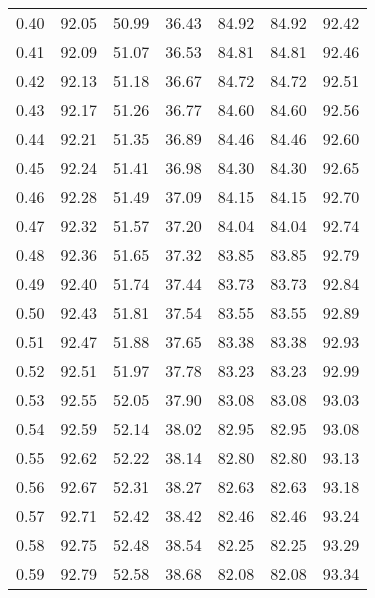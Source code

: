 \begin{tabular}{|c|c|c|c|c|c|c|}
      0.40 &     92.05 &     50.99 &      36.43 &   84.92 &      84.92 &         92.42 \\
      0.41 &     92.09 &     51.07 &      36.53 &   84.81 &      84.81 &         92.46 \\
      0.42 &     92.13 &     51.18 &      36.67 &   84.72 &      84.72 &         92.51 \\
      0.43 &     92.17 &     51.26 &      36.77 &   84.60 &      84.60 &         92.56 \\
      0.44 &     92.21 &     51.35 &      36.89 &   84.46 &      84.46 &         92.60 \\
      0.45 &     92.24 &     51.41 &      36.98 &   84.30 &      84.30 &         92.65 \\
      0.46 &     92.28 &     51.49 &      37.09 &   84.15 &      84.15 &         92.70 \\
      0.47 &     92.32 &     51.57 &      37.20 &   84.04 &      84.04 &         92.74 \\
      0.48 &     92.36 &     51.65 &      37.32 &   83.85 &      83.85 &         92.79 \\
      0.49 &     92.40 &     51.74 &      37.44 &   83.73 &      83.73 &         92.84 \\
      0.50 &     92.43 &     51.81 &      37.54 &   83.55 &      83.55 &         92.89 \\
      0.51 &     92.47 &     51.88 &      37.65 &   83.38 &      83.38 &         92.93 \\
      0.52 &     92.51 &     51.97 &      37.78 &   83.23 &      83.23 &         92.99 \\
      0.53 &     92.55 &     52.05 &      37.90 &   83.08 &      83.08 &         93.03 \\
      0.54 &     92.59 &     52.14 &      38.02 &   82.95 &      82.95 &         93.08 \\
      0.55 &     92.62 &     52.22 &      38.14 &   82.80 &      82.80 &         93.13 \\
      0.56 &     92.67 &     52.31 &      38.27 &   82.63 &      82.63 &         93.18 \\
      0.57 &     92.71 &     52.42 &      38.42 &   82.46 &      82.46 &         93.24 \\
      0.58 &     92.75 &     52.48 &      38.54 &   82.25 &      82.25 &         93.29 \\
      0.59 &     92.79 &     52.58 &      38.68 &   82.08 &      82.08 &         93.34 \\

\end{tabular}
